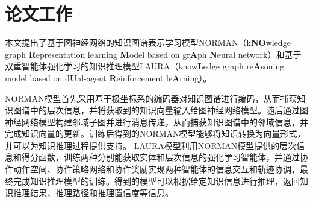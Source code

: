 \documentclass[algorithmlist, AutoFakeBold, AutoFakeSlant, figurelist, tablelist, nomlist, engineering]{seuthesix}
\begin{document}
\section{论文工作}
本文提出了基于图神经网络的知识图谱表示学习模型NORMAN（k\textbf{NO}wledge graph \textbf{R}epresentation learning \textbf{M}odel based on gr\textbf{A}ph \textbf{N}eural network）和基于双重智能体强化学习的知识推理模型LAURA（know\textbf{L}edge graph re\textbf{A}soning model based on d\textbf{U}al-agent \textbf{R}einforcement le\textbf{A}rning）。

NORMAN模型首先采用基于极坐标系的编码器对知识图谱进行编码，从而捕获知识图谱中的层次信息，并将获取到的知识向量输入给图神经网络模型。随后通过图神经网络模型构建邻域子图并进行消息传递，从而捕获知识图谱中的邻域信息，并完成知识向量的更新。训练后得到的NORMAN模型能够将知识转换为向量形式，并可以为知识推理过程提供支持。
LAURA模型利用NORMAN模型提供的层次信息和得分函数，训练两种分别能获取实体和层次信息的强化学习智能体，并通过协作动作空间、协作策略网络和协作奖励实现两种智能体的信息交互和轨迹协调，最终完成知识推理模型的训练。得到的模型可以根据给定知识信息进行推理，返回知识推理结果、推理路径和推理置信度等信息。
\end{document}
